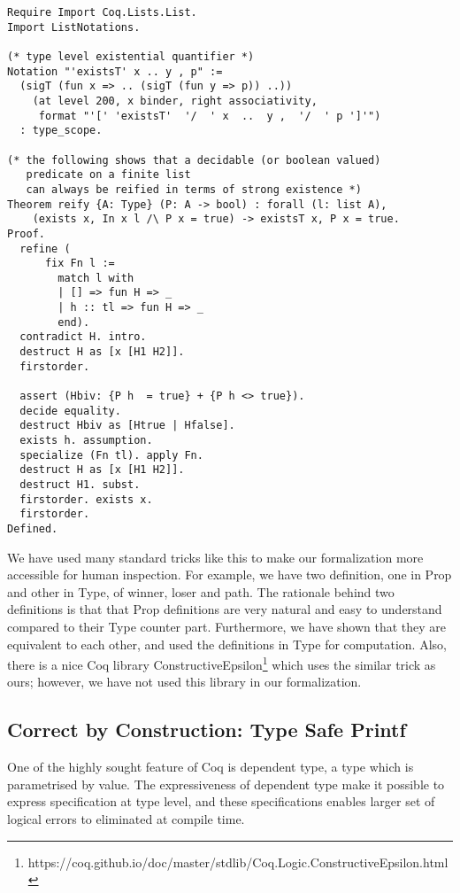   
  
  \begin{verbatim}
Require Import Coq.Lists.List.
Import ListNotations.

(* type level existential quantifier *)
Notation "'existsT' x .. y , p" :=
  (sigT (fun x => .. (sigT (fun y => p)) ..))
    (at level 200, x binder, right associativity,
     format "'[' 'existsT'  '/  ' x  ..  y ,  '/  ' p ']'")
  : type_scope.

(* the following shows that a decidable (or boolean valued) 
   predicate on a finite list
   can always be reified in terms of strong existence *)
Theorem reify {A: Type} (P: A -> bool) : forall (l: list A), 
    (exists x, In x l /\ P x = true) -> existsT x, P x = true.
Proof.
  refine (
      fix Fn l :=
        match l with
        | [] => fun H => _
        | h :: tl => fun H => _
        end).
  contradict H. intro.
  destruct H as [x [H1 H2]].
  firstorder.

  assert (Hbiv: {P h  = true} + {P h <> true}).
  decide equality.
  destruct Hbiv as [Htrue | Hfalse].
  exists h. assumption.
  specialize (Fn tl). apply Fn.
  destruct H as [x [H1 H2]].
  destruct H1. subst.
  firstorder. exists x.
  firstorder.
Defined. 

  \end{verbatim}
    
    
    
  We have used many standard tricks like this  
  to make  our formalization more accessible for human inspection.
  For example, we have two definition, one in Prop and other in Type, 
  of winner, loser and path. The rationale behind two definitions 
  is that that Prop definitions are very natural and easy to understand 
  compared to their Type counter part. Furthermore, we have shown that they are 
  equivalent to each other, and used the definitions in Type for
  computation.  Also, there is a nice Coq library 
  ConstructiveEpsilon\footnote{https://coq.github.io/doc/master/stdlib/Coq.Logic.ConstructiveEpsilon.html}
  which uses the similar trick as ours; however, we have not used this library in 
  our formalization. 
 \subsection{Correct by Construction: Type Safe Printf}
 \label{sec:deplambda}
  One of the highly sought feature of Coq is dependent type, 
  a type which is parametrised by value.  
  The expressiveness of dependent type make it possible
  to express specification at type level, and these specifications enables larger 
  set of  logical errors to eliminated at compile time. 
  
